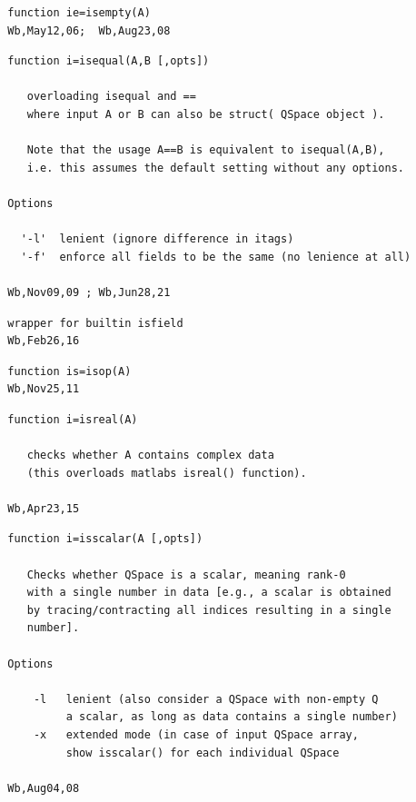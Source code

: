 \documentclass[twoside,12pt]{article}
\begin{document}

\begin{verbatim}
  function ie=isempty(A)
  Wb,May12,06;  Wb,Aug23,08
\end{verbatim}

\pagebreak[3]



\begin{verbatim}
  function i=isequal(A,B [,opts])
  
     overloading isequal and ==
     where input A or B can also be struct( QSpace object ).
 
     Note that the usage A==B is equivalent to isequal(A,B),
     i.e. this assumes the default setting without any options.
 
  Options
 
    '-l'  lenient (ignore difference in itags)
    '-f'  enforce all fields to be the same (no lenience at all)
 
  Wb,Nov09,09 ; Wb,Jun28,21
\end{verbatim}

\pagebreak[3]



\begin{verbatim}
  wrapper for builtin isfield
  Wb,Feb26,16
\end{verbatim}

\pagebreak[3]



\begin{verbatim}
  function is=isop(A)
  Wb,Nov25,11
\end{verbatim}

\pagebreak[3]



\begin{verbatim}
  function i=isreal(A)
 
     checks whether A contains complex data
     (this overloads matlabs isreal() function).
 
  Wb,Apr23,15
\end{verbatim}

\pagebreak[3]



\begin{verbatim}
  function i=isscalar(A [,opts])
 
     Checks whether QSpace is a scalar, meaning rank-0
     with a single number in data [e.g., a scalar is obtained
     by tracing/contracting all indices resulting in a single
     number].
 
  Options
 
      -l   lenient (also consider a QSpace with non-empty Q
           a scalar, as long as data contains a single number)
      -x   extended mode (in case of input QSpace array,
           show isscalar() for each individual QSpace
 
  Wb,Aug04,08
\end{verbatim}
\end{document}
